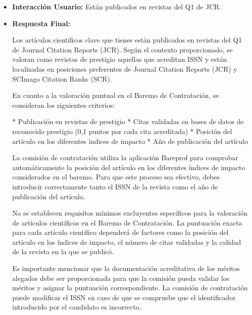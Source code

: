 \documentclass{article}
\begin{document}
\begin{itemize}
\begin{itemize}
                        \textbf{Nota importante:}
                        * La comisión de contratación puede modificar el ISSN en caso de que se compruebe que el identificador introducido por el candidato es incorrecto.
                        * La documentación acreditativa de los méritos alegados debe ser proporcionada por el candidato para que la comisión pueda validar los méritos y asignar la puntuación correspondiente.
                  \item \textbf{Interacción Usuario:} Están publicados en revistas del Q1 de JCR.
                  \item \textbf{Respuesta Final:}

                        Los artículos científicos clave que tienes están publicados en revistas del Q1 de Journal Citation Reports (JCR). Según el contexto proporcionado, se valoran como revistas de prestigio aquellas que acreditan ISSN y están localizadas en posiciones preferentes de Journal Citation Reports (JCR) y SCImago Citation Ranks (SCR).

                        En cuanto a la valoración puntual en el Baremo de Contratación, se consideran los siguientes criterios:

                        * Publicación en revistas de prestigio
                        * Citas validadas en bases de datos de reconocido prestigio (0,1 puntos por cada cita acreditada)
                        * Posición del artículo en los diferentes índices de impacto
                        * Año de publicación del artículo

                        La comisión de contratación utiliza la aplicación Bareprof para comprobar automáticamente la posición del artículo en los diferentes índices de impacto considerados en el baremo. Para que este proceso sea efectivo, debes introducir correctamente tanto el ISSN de la revista como el año de publicación del artículo.

                        No se establecen requisitos mínimos excluyentes específicos para la valoración de artículos científicos en el Baremo de Contratación. La puntuación exacta para cada artículo científico dependerá de factores como la posición del artículo en los índices de impacto, el número de citas validadas y la calidad de la revista en la que se publicó.

                        Es importante mencionar que la documentación acreditativa de los méritos alegados debe ser proporcionada para que la comisión pueda validar los méritos y asignar la puntuación correspondiente. La comisión de contratación puede modificar el ISSN en caso de que se compruebe que el identificador introducido por el candidato es incorrecto.


\end{itemize}
\end{itemize}
\end{document}
